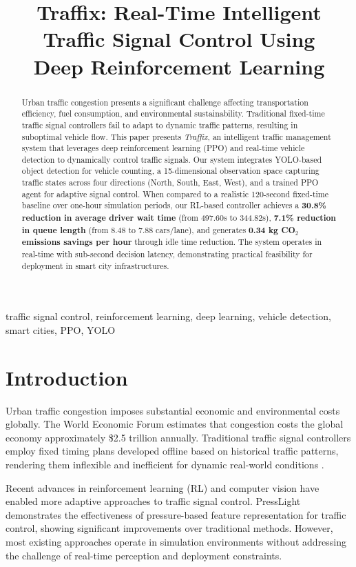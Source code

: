 \documentclass[10pt,conference]{IEEEtran}
\title{Traffix: Real-Time Intelligent Traffic Signal Control Using \\ Deep Reinforcement Learning}
\author{
\IEEEauthorblockN{Anonymous}
\IEEEauthorblockA{
    Department of Computer Science \\
    Anonymous University, Location
}
}
\begin{document}
\maketitle

\begin{abstract}
Urban traffic congestion presents a significant challenge affecting transportation efficiency, fuel consumption, and environmental sustainability. Traditional fixed-time traffic signal controllers fail to adapt to dynamic traffic patterns, resulting in suboptimal vehicle flow. This paper presents \textit{Traffix}, an intelligent traffic management system that leverages deep reinforcement learning (PPO) and real-time vehicle detection to dynamically control traffic signals. Our system integrates YOLO-based object detection for vehicle counting, a 15-dimensional observation space capturing traffic states across four directions (North, South, East, West), and a trained PPO agent for adaptive signal control. When compared to a realistic 120-second fixed-time baseline over one-hour simulation periods, our RL-based controller achieves a \textbf{30.8\% reduction in average driver wait time} (from 497.60s to 344.82s), \textbf{7.1\% reduction in queue length} (from 8.48 to 7.88 cars/lane), and generates \textbf{0.34 kg CO$_2$ emissions savings per hour} through idle time reduction. The system operates in real-time with sub-second decision latency, demonstrating practical feasibility for deployment in smart city infrastructures.
\end{abstract}

\begin{IEEEkeywords}
traffic signal control, reinforcement learning, deep learning, vehicle detection, smart cities, PPO, YOLO
\end{IEEEkeywords}

\section{Introduction}

Urban traffic congestion imposes substantial economic and environmental costs globally. The World Economic Forum estimates that congestion costs the global economy approximately \$2.5 trillion annually. Traditional traffic signal controllers employ fixed timing plans developed offline based on historical traffic patterns, rendering them inflexible and inefficient for dynamic real-world conditions \cite{webster1958}.

Recent advances in reinforcement learning (RL) and computer vision have enabled more adaptive approaches to traffic signal control. PressLight \cite{wei2019presslight} demonstrates the effectiveness of pressure-based feature representation for traffic control, showing significant improvements over traditional methods. However, most existing approaches operate in simulation environments without addressing the challenge of real-time perception and deployment constraints.
\end{document}
